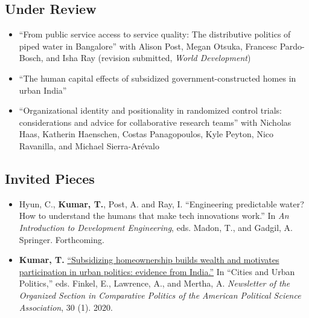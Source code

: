\documentclass[11pt]{article}
\begin{document}
\subsection*{Under Review}

\begin{itemize}

\item[]``From public service access to service quality: The distributive politics of piped water in Bangalore'' with Alison Post, Megan Otsuka, Francesc Pardo-Bosch, and Isha Ray (revision submitted, \textit{World Development})
	

	\item[]``The human capital effects of subsidized government-constructed homes in urban India'' 

	\item[]``Organizational identity and positionality in randomized control trials: considerations and advice for collaborative research teams'' with Nicholas Haas, Katherin Haenschen, Costas Panagopoulos, Kyle Peyton, Nico Ravanilla, and Michael  Sierra-Ar\'{e}valo
		
		\end{itemize}
		



\subsection*{Invited Pieces}
\begin{itemize}
	\item[]Hyun, C., \textbf{Kumar, T.}, Post, A. and Ray, I. ``Engineering predictable water? How to understand the humans that make tech innovations work.'' In \textit{An Introduction to Development Engineering}, eds. Madon, T., and Gadgil, A. Springer. Forthcoming.

\item[]\textbf{Kumar, T.} \href{https://www.comparativepoliticsnewsletter.org/wp-content/uploads/2020/05/Spring-Newsletter-2020.pdf}{``Subsidizing homeownership builds wealth and motivates participation in urban politics: evidence from India.''}  In ``Cities and Urban Politics,'' eds. Finkel, E.,  Lawrence, A.,  and Mertha, A.  \textit{Newsletter of the Organized Section in Comparative Politics of the American Political Science Association}, 30 (1). 2020.
	\end{itemize}
	
\end{document}
